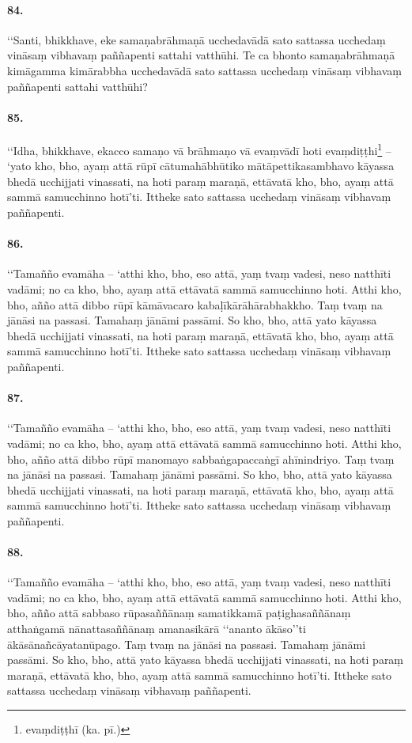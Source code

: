 \paragraph{84.}
‘‘Santi, bhikkhave, eke samaṇabrāhmaṇā ucchedavādā sato sattassa ucchedaṃ vināsaṃ vibhavaṃ paññapenti sattahi vatthūhi. Te ca bhonto samaṇabrāhmaṇā kimāgamma kimārabbha ucchedavādā sato sattassa ucchedaṃ vināsaṃ vibhavaṃ paññapenti sattahi vatthūhi?

\paragraph{85.}
‘‘Idha, bhikkhave, ekacco samaṇo vā brāhmaṇo vā evaṃvādī hoti evaṃdiṭṭhi\footnote{evaṃdiṭṭhī (ka. pī.)} – ‘yato kho, bho, ayaṃ attā rūpī cātumahābhūtiko mātāpettikasambhavo kāyassa bhedā ucchijjati vinassati, na hoti paraṃ maraṇā, ettāvatā kho, bho, ayaṃ attā sammā samucchinno hotī’ti. Ittheke sato sattassa ucchedaṃ vināsaṃ vibhavaṃ paññapenti.

\paragraph{86.}
‘‘Tamañño evamāha – ‘atthi kho, bho, eso attā, yaṃ tvaṃ vadesi, neso natthīti vadāmi; no ca kho, bho, ayaṃ attā ettāvatā sammā samucchinno hoti. Atthi kho, bho, añño attā dibbo rūpī kāmāvacaro kabaḷīkārāhārabhakkho. Taṃ tvaṃ na jānāsi na passasi. Tamahaṃ jānāmi passāmi. So kho, bho, attā yato kāyassa bhedā ucchijjati vinassati, na hoti paraṃ maraṇā, ettāvatā kho, bho, ayaṃ attā sammā samucchinno hotī’ti. Ittheke sato sattassa ucchedaṃ vināsaṃ vibhavaṃ paññapenti.

\paragraph{87.}
‘‘Tamañño evamāha – ‘atthi kho, bho, eso attā, yaṃ tvaṃ vadesi, neso natthīti vadāmi; no ca kho, bho, ayaṃ attā ettāvatā sammā samucchinno hoti. Atthi kho, bho, añño attā dibbo rūpī manomayo sabbaṅgapaccaṅgī ahīnindriyo. Taṃ tvaṃ na jānāsi na passasi. Tamahaṃ jānāmi passāmi. So kho, bho, attā yato kāyassa bhedā ucchijjati vinassati, na hoti paraṃ maraṇā, ettāvatā kho, bho, ayaṃ attā sammā samucchinno hotī’ti. Ittheke sato sattassa ucchedaṃ vināsaṃ vibhavaṃ paññapenti.

\paragraph{88.}
‘‘Tamañño evamāha – ‘atthi kho, bho, eso attā, yaṃ tvaṃ vadesi, neso natthīti vadāmi; no ca kho, bho, ayaṃ attā ettāvatā sammā samucchinno hoti. Atthi kho, bho, añño attā sabbaso rūpasaññānaṃ samatikkamā paṭighasaññānaṃ atthaṅgamā nānattasaññānaṃ amanasikārā ‘‘ananto ākāso’’ti ākāsānañcāyatanūpago. Taṃ tvaṃ na jānāsi na passasi. Tamahaṃ jānāmi passāmi. So kho, bho, attā yato kāyassa bhedā ucchijjati vinassati, na hoti paraṃ maraṇā, ettāvatā kho, bho, ayaṃ attā sammā samucchinno hotī’ti. Ittheke sato sattassa ucchedaṃ vināsaṃ vibhavaṃ paññapenti.

